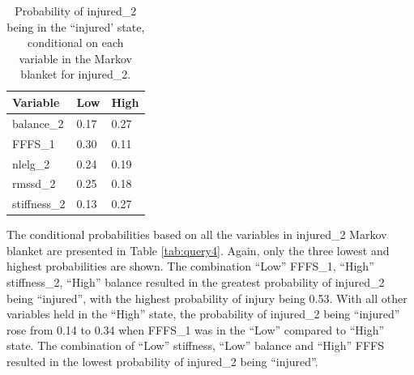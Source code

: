\documentclass[
  english,
  man,floatsintext]{apa6}
\begin{document}
\begin{table}[H]

\begin{center}
\begin{threeparttable}

\caption{\label{tab:query3}Probability of injured\_2 being in the ``injured' state, conditional on each variable in the Markov blanket for injured\_2.}

\begin{tabular}{lll}
\toprule
Variable & Low & High\\
\midrule
balance\_2 & 0.17 & 0.27\\
FFFS\_1 & 0.30 & 0.11\\
nlelg\_2 & 0.24 & 0.19\\
rmssd\_2 & 0.25 & 0.18\\
stiffness\_2 & 0.13 & 0.27\\
\bottomrule
\end{tabular}

\end{threeparttable}
\end{center}

\end{table}

The conditional probabilities based on all the variables in injured\_2 Markov blanket are presented in Table \ref{tab:query4}.
Again, only the three lowest and highest probabilities are shown.
The combination \enquote{Low} FFFS\_1, \enquote{High} stiffness\_2, \enquote{High} balance resulted in the greatest probability of injured\_2 being \enquote{injured}, with the highest probability of injury being 0.53.
With all other variables held in the \enquote{High} state, the probability of injured\_2 being \enquote{injured} rose from 0.14 to 0.34 when FFFS\_1 was in the \enquote{Low} compared to \enquote{High} state.
The combination of \enquote{Low} stiffness, \enquote{Low} balance and \enquote{High} FFFS resulted in the lowest probability of injured\_2 being \enquote{injured}.
\end{document}
